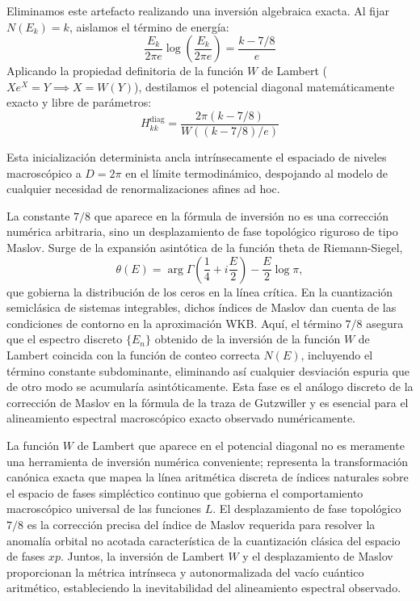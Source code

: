 \documentclass[aps,prl,preprint,superscriptaddress,floatfix]{revtex4-2}
\begin{document}
Eliminamos este artefacto realizando una inversión algebraica exacta. Al fijar $N(E_k) = k$, aislamos el término de energía:
\begin{equation}
\frac{E_k}{2\pi e} \log\left(\frac{E_k}{2\pi e}\right) = \frac{k - 7/8}{e}
\end{equation}
Aplicando la propiedad definitoria de la función $W$ de Lambert ($X e^X = Y \implies X = W(Y)$), destilamos el potencial diagonal matemáticamente exacto y libre de parámetros:
\begin{equation}
\boxed{ H_{kk}^{\text{diag}} = \frac{2\pi (k - 7/8)}{W((k - 7/8)/e)} }
\end{equation}

Esta inicialización determinista ancla intrínsecamente el espaciado de niveles macroscópico a $D = 2\pi$ en el límite termodinámico, despojando al modelo de cualquier necesidad de renormalizaciones afines ad hoc.

La constante $7/8$ que aparece en la fórmula de inversión no es una corrección numérica arbitraria, sino un desplazamiento de fase topológico riguroso de tipo Maslov. Surge de la expansión asintótica de la función theta de Riemann-Siegel,
\begin{equation}
\theta(E) = \arg\Gamma\left(\frac14 + i\frac{E}{2}\right) - \frac{E}{2}\log\pi,
\end{equation}
que gobierna la distribución de los ceros en la línea crítica. En la cuantización semiclásica de sistemas integrables, dichos índices de Maslov dan cuenta de las condiciones de contorno en la aproximación WKB. Aquí, el término $7/8$ asegura que el espectro discreto $\{E_n\}$ obtenido de la inversión de la función $W$ de Lambert coincida con la función de conteo correcta $N(E)$, incluyendo el término constante subdominante, eliminando así cualquier desviación espuria que de otro modo se acumularía asintóticamente. Esta fase es el análogo discreto de la corrección de Maslov en la fórmula de la traza de Gutzwiller y es esencial para el alineamiento espectral macroscópico exacto observado numéricamente.

La función $W$ de Lambert que aparece en el potencial diagonal no es meramente una herramienta de inversión numérica conveniente; representa la transformación canónica exacta que mapea la línea aritmética discreta de índices naturales sobre el espacio de fases simpléctico continuo que gobierna el comportamiento macroscópico universal de las funciones $L$. El desplazamiento de fase topológico $7/8$ es la corrección precisa del índice de Maslov requerida para resolver la anomalía orbital no acotada característica de la cuantización clásica del espacio de fases $xp$. Juntos, la inversión de Lambert $W$ y el desplazamiento de Maslov proporcionan la métrica intrínseca y autonormalizada del vacío cuántico aritmético, estableciendo la inevitabilidad del alineamiento espectral observado.
\end{document}
